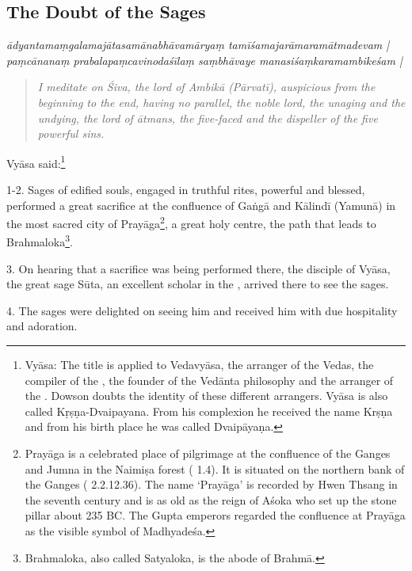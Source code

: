 \subsection{The Doubt of the Sages}

\begin{shloka}\itshape
  ādyantamaṃgalamajātasamānabhāvamāryaṃ tamīśamajarāmaramātmadevam |\\
  paṃcānanaṃ prabalapaṃcavinodaśīlaṃ saṃbhāvaye manasiśaṃkaramambikeśam |
\end{shloka}

\begin{quote}
  \emph{I meditate on Śiva, the lord of Ambikā (Pārvatī), auspicious from the
        beginning to the end, having no parallel, the noble lord, the unaging
        and the undying, the lord of ātmans, the five-faced and the dispeller
        of the five powerful sins.}
\end{quote}

Vyāsa said:\footnote{Vyāsa: The title is applied to Vedavyāsa, the arranger
of the Vedas, the compiler of the , the founder of the Vedānta
philosophy and the arranger of the . Dowson doubts the identity of
these different arrangers. Vyāsa is also called Kṛṣṇa-Dvaipayana. From his
complexion he received the name Krṣṇa and from his birth place he was called
Dvaipāyaṇa.}

1-2. Sages of edified souls, engaged in truthful rites, powerful and blessed,
performed a great sacrifice at the confluence of Gaṅgā and Kālindī (Yamunā) in
the most sacred city of Prayāga\footnote{Prayāga is a celebrated place of
pilgrimage at the confluence of the Ganges and Jumna in the Naimiṣa forest
( 1.4). It is situated on the northern bank
of the Ganges ( 2.2.12.36). The name ‘Prayāga’ is recorded by
Hwen Thsang in the seventh century and is as old as the reign of Aśoka who set
up the stone pillar about 235 BC. The Gupta emperors regarded the confluence at
Prayāga as the visible symbol of Madhyadeśa.}, a great holy centre, the path
that leads to Brahmaloka\footnote{Brahmaloka, also called Satyaloka, is the
abode of Brahmā.}.

3. On hearing that a sacrifice was being performed there, the disciple of Vyāsa,
the great sage Sūta, an excellent scholar in the , arrived there to
see the sages.

4. The sages were delighted on seeing him and received him with due hospitality
and adoration.

